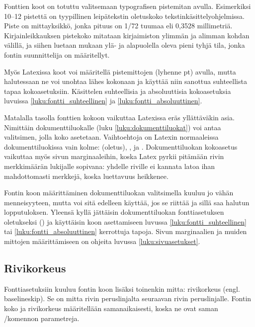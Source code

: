 Fonttien koot on totuttu valitsemaan typo\-grafisen pistemitan avulla.
Esimerkiksi 10--12 pistettä on tyypillinen leipätekstin oletuskoko
teks\-tin\-kä\-sit\-tely\-ohjel\-mis\-sa. Piste on mitta\-yksikkö, jonka
pituus on 1/72 tuumaa eli 0,3528 millimetriä. Kirjainleikkauksen
pistekoko mitataan kirjaimiston ylimmän ja alimman kohdan välillä, ja
siihen luetaan mukaan ylä- ja alapuolella oleva pieni tyhjä tila, jonka
fontin suunnittelija on määritellyt.

Myös Latexissa koot voi määritellä pistemittojen (lyhenne pt) avulla,
mutta halutessaan ne voi unohtaa lähes kokonaan ja käyttää niin sanottua
suhteellista tapaa koko\-asetuksiin. Käsittelen suhteellisia ja
absoluuttisia koko\-ase\-tuk\-sia luvuissa
\ref{luku:fontti_suhteellinen} ja \ref{luku:fontti_absoluuttinen}.

Matalalla tasolla fonttien kokoon vaikuttaa Latexissa eräs yllättäväkin
asia. Nimittäin dokumenttiluokalle (luku \ref{luku:dokumenttiluokat})
voi antaa valitsimen, jolla koko asetetaan. Vaihto\-ehtoja on Latexin
normaaleissa dokumenttiluokissa vain kolme: \koodi{10pt} (oletus),
\koodi{11pt}, ja \koodi{12pt}. Dokumenttiluokan koko\-asetus vaikuttaa
myös sivun marginaaleihin, koska Latex pyrkii pitämään rivin
merkkimäärän lukijalle sopivana: yhdelle riville ei kannata latoa ihan
mahdottomasti merkkejä, koska luettavuus heikkenee.

Fontin koon määrittäminen dokumenttiluokan valitsimella kuuluu jo vähän
menneisyyteen, mutta voi sitä edelleen käyttää, jos se riittää ja sillä
saa halutun lopputuloksen. Yleensä kyllä jättäisin dokumenttiluokan
fontti\-asetuksen oletukseksi (\koodi{10pt}) ja käyttäisin koon
asettamiseen luvussa \ref{luku:fontti_suhteellinen} tai
\ref{luku:fontti_absoluuttinen} kerrottuja tapoja. Sivun marginaalien ja
muiden mittojen määrittämiseen on ohjeita luvussa
\ref{luku:sivuasetukset}.

\subsection{Rivikorkeus}

Fontti\-asetuksiin kuuluu fontin koon lisäksi toinenkin mitta:
rivikorkeus (engl. \textenglish{base\-line\-skip}). Se on mitta rivin
peruslinjalta seuraavan rivin peruslinjalle. Fontin koko ja rivikorkeus
määritellään saman\-aikaisesti, koska ne ovat saman \-/komennon parametreja.

\begin{koodilohkosis}
  \fontsize{10pt}{12pt} \selectfont
\end{koodilohkosis}

